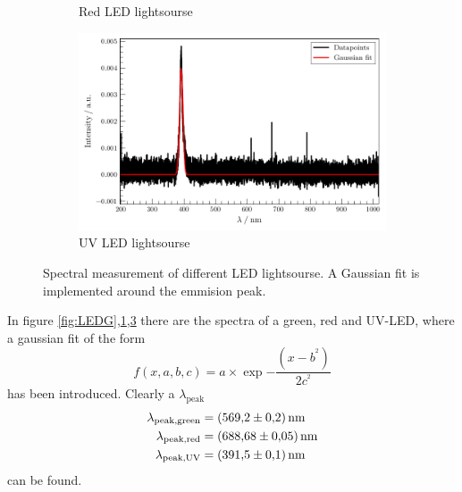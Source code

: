 \begin{figure}
\begin{subfigure}{.3\textwidth}
    \caption{Red LED lightsourse}
    \label{fig:LEDR}
\end{subfigure}
\begin{subfigure}{.3\textwidth}
    \centering
    \includegraphics[width=\textwidth]{plots/LED-UV.pdf}
  \caption{UV LED lightsourse}
    \label{fig:LEDUV}
\end{subfigure}
\caption{Spectral measurement of different LED lightsourse. A Gaussian fit is implemented around the emmision peak.}
\end{figure}

In figure \ref{fig:LEDG},\ref{fig:LEDR},\ref{fig:LEDUV} there are the spectra of a green, red and UV-LED, where a gaussian fit of the form 
\begin{equation}
    f(x,a,b,c) = a \times \exp{-\frac{(x-b^^2)}{2 c^^2}}
\end{equation}\label{eq:gauss}
has been introduced. Clearly a $\lambda_\text{peak}$ 
\begin{align*}
    \lambda_\text{peak,green} &= \SI{569.2 \pm 0.2}{\nano\meter} \\
    \lambda_\text{peak,red} &= \SI{688.68 \pm 0.05}{\nano\meter} \\
    \lambda_\text{peak,UV} &= \SI{391.5 \pm 0.1}{\nano\meter} \\
\end{align*}
can be found.

